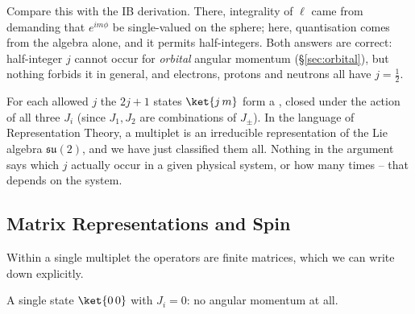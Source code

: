 Compare this with the IB derivation. There, integrality of $\ell$ came from demanding that $e^{im\phi}$ be single-valued on the sphere; here, quantisation comes from the algebra alone, and it permits half-integers. Both answers are correct: half-integer $j$ cannot occur for \emph{orbital} angular momentum (\S\ref{sec:orbital}), but nothing forbids it in general, and electrons, protons and neutrons all have $j = \frac12$.

\begin{center}
\end{center}

For each allowed $j$ the $2j+1$ states $\ket{j\,m}$ form a , closed under the action of all three $J_i$ (since $J_1, J_2$ are combinations of $J_\pm$). In the language of Representation Theory, a multiplet is an irreducible representation of the Lie algebra $\mathfrak{su}(2)$, and we have just classified them all. Nothing in the argument says which $j$ actually occur in a given physical system, or how many times -- that depends on the system.

\subsection{Matrix Representations and Spin}

Within a single multiplet the operators are finite matrices, which we can write down explicitly.

\begin{example}[$j = 0$]
    A single state $\ket{0\,0}$ with $J_i = 0$: no angular momentum at all.
\end{example}

